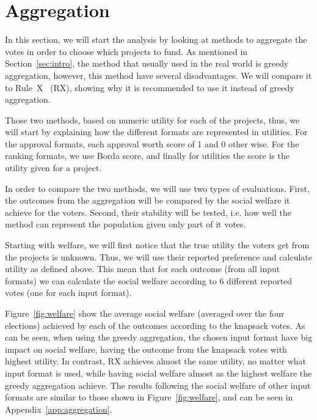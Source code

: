 \documentclass[10pt]{article}
\begin{document}
\section{Aggregation}\label{sec:aggregation}
In this section, we will start the analysis by looking at methods to aggregate the votes in order to choose which projects to fund.
 As mentioned in Section~\ref{sec:intro}, the method that usually used in the real world is greedy aggregation, however, this method have several disadvantages. We will compare it to Rule~X~\citep{peters2020proportional} (RX), showing why it is recommended to use it instead of greedy aggregation. 

Those two methods, based on numeric utility for each of the projects, thus, we will start by explaining how the different formats are represented in utilities. For the approval formats, each approval worth score of 1 and 0 other wise. For the ranking formats, we use Borda score, and finally for utilities the score is the utility given for a project.

In order to compare the two methods, we will use two types of evaluations. First, the outcomes from the aggregation will be compared by the social welfare it achieve for the voters. Second, their stability will be tested, i.e. how well the method can represent the population given only part of it votes.

Starting with welfare, we will first notice that the true utility the voters get from the projects is unknown. Thus, we will use their reported preference and calculate utility as defined above. This mean that for each outcome (from all input formats) we can calculate the social welfare according to 6 different reported votes (one for each input format). 

Figure~\ref{fig:welfare} show the average social welfare (averaged over the four elections) achieved by each of the outcomes according to the knapsack votes. As can be seen, when using the greedy aggregation, the chosen input format have big impact on social welfare, having the outcome from the knapsack votes with highest utility. In contrast, RX achieves almost the same utility, no matter what input format is used, while having social welfare almost as the highest welfare the greedy aggregation achieve. The results following the social welfare of other input formats are similar to those shown in Figure~\ref{fig:welfare}, and can be seen in Appendix~\ref{app:aggregation}.
\end{document}
